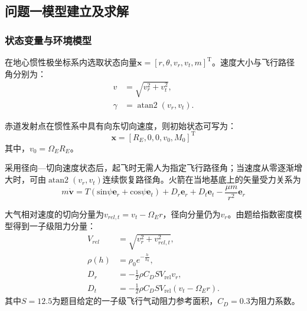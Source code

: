 \documentclass{JXUSTmodeling}
\begin{document}
\subsection{问题一模型建立及求解}
\label{sec:5.1}
\subsubsection{状态变量与环境模型}
在地心惯性极坐标系内选取状态向量$\mathbf{x}=\left[r, \theta ,v_r, v_t, m\right]^\mathrm{T}$。速度大小与飞行路径角分别为：
\begin{equation}
	\begin{aligned}
		v &= \sqrt{v_r^2 + v_t^2}, \\
		\gamma &= \operatorname{atan2}(v_r, v_t).
	\end{aligned}
	\label{eq:1}
\end{equation}

赤道发射点在惯性系中具有向东切向速度，则初始状态可写为：
\begin{equation}
	\mathbf{x}=\left[R_E, 0, 0, v_0, M_0 \right]^{\mathrm{T}}
	\label{eq:2}
\end{equation}
其中，$v_0 = \Omega_E R_E$。

采用径向—切向速度状态后，起飞时无需人为指定飞行路径角；当速度从零逐渐增大时，可由$\operatorname{atan2}(v_r,v_t)$连续恢复路径角。火箭在当地基底上的矢量受力关系为
\begin{equation}
	m \dot{\mathbf{v}}=T\left(
	\mathrm{sin}\psi \mathbf{e}_r
	+
	\mathrm{cos} \psi \mathbf{e}_t
	\right)
	+
	D_r\mathbf{e}_r
	+
	D_t\mathbf{e}_t
	-
	\frac{\mu m}{r^2}\mathbf{e}_r
	\label{eq:base}
\end{equation}

大气相对速度的切向分量为$v_{rel, t}=v_t - \Omega_Er$，径向分量仍为$v_r$。由题给指数密度模型得到一子级阻力分量：
\begin{equation}
	\begin{aligned}
		V_{rel} 
		&=
		\sqrt{v_r^2  + v_{rel, t}^2},\\
		\rho(h)
		&=
		\rho_0 e^{-\frac{h}{h_0}}, \\
		D_r
		&=
		-\frac{1}{2}\rho C_D S V_{\mathrm{rel}}v_r, \\
		D_t
		&=
		-\frac{1}{2}\rho C_D S V_{\mathrm{rel}}
		\left(v_t-\Omega_E r\right).
	\end{aligned}
	\label{eq:4}
\end{equation}
其中$S = 12.5$为题目给定的一子级飞行气动阻力参考面积，$C_D = 0.3$为阻力系数。
\end{document}
